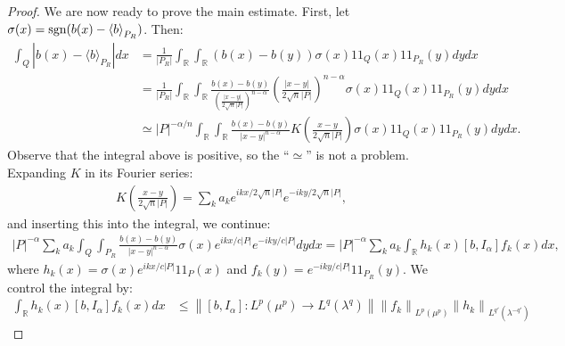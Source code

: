 \documentclass[12pt]{amsart}
\begin{document}
\begin{proof}
We are now ready to prove the main estimate. First, let
$\sigma(x)=\textnormal{sgn}(b(x)-{\langle {b} \rangle}_{P_R})$. Then:
\begin{align*}
\int_{Q}{\ensuremath{\left\vert{b(x)-{\langle {b} \rangle}_{P_R}}\right\vert}}dx
&=\frac{1}{{\ensuremath{\left\vert{P_R}\right\vert}}}\int_{\mathbb{R}}\int_{\mathbb{R}}
  (b(x)-b(y))\sigma(x){1\!\!1}_{Q}(x){1\!\!1}_{P_R}(y)dydx
\\&=\frac{1}{{\ensuremath{\left\vert{P_R}\right\vert}}}\int_{\mathbb{R}}\int_{\mathbb{R}}
  \frac{b(x)-b(y)}{\left(\frac{{\ensuremath{\left\vert{x-y}\right\vert}}}{2\sqrt{n}{\ensuremath{\left\vert{P}\right\vert}}}\right)^{n-\alpha}}
  \left(\frac{{\ensuremath{\left\vert{x-y}\right\vert}}}{2\sqrt{n}{\ensuremath{\left\vert{P}\right\vert}}}\right)^{n-\alpha}
  \sigma(x){1\!\!1}_{Q}(x){1\!\!1}_{P_R}(y)dydx
\\&\simeq {\ensuremath{\left\vert{P}\right\vert}}^{-\alpha/n}\int_{\mathbb{R}}\int_{\mathbb{R}}
  \frac{b(x)-b(y)}{{\ensuremath{\left\vert{x-y}\right\vert}}^{n-\alpha}}
  K\left(\frac{x-y}{2\sqrt{n}{\ensuremath{\left\vert{P}\right\vert}}}\right)
  \sigma(x){1\!\!1}_{Q}(x){1\!\!1}_{P_R}(y)dydx.
\end{align*}
Observe that the integral above is positive, so the ``$\simeq$''
is not a problem. Expanding $K$ in its Fourier series:
\begin{align*}
K\left(\frac{x-y}{2\sqrt{n}{\ensuremath{\left\vert{P}\right\vert}}}\right)
=\sum_{k}a_ke^{ikx/2\sqrt{n}{\ensuremath{\left\vert{P}\right\vert}}}e^{-iky/2\sqrt{n}{\ensuremath{\left\vert{P}\right\vert}}},
\end{align*}
and inserting this into the integral, we continue:
\begin{align*}
{\ensuremath{\left\vert{P}\right\vert}}^{-\alpha}\sum_{k}a_k\int_{Q}\int_{P_R}
  \frac{b(x)-b(y)}{{\ensuremath{\left\vert{x-y}\right\vert}}^{n-\alpha}}
  \sigma(x)e^{ikx/c{\ensuremath{\left\vert{P}\right\vert}}}e^{-iky/c{\ensuremath{\left\vert{P}\right\vert}}}dydx
={\ensuremath{\left\vert{P}\right\vert}}^{-\alpha}\sum_{k}a_k\int_{\mathbb{R}}
  h_k(x)[b,I_\alpha]f_k(x)dx,
\end{align*}
where $h_k(x)=\sigma(x)e^{ikx/c{\ensuremath{\left\vert{P}\right\vert}}}{1\!\!1}_{P}(x)$ and
$f_k(y)=e^{-iky/c{\ensuremath{\left\vert{P}\right\vert}}}{1\!\!1}_{P_R}(y)$. We control the integral
by:
\begin{align*}
\int_{\mathbb{R}}h_k(x)[b,I_\alpha]f_k(x)dx
&\leq {\ensuremath{\left\|{[b,I_\alpha]:L^p(\mu^p)\to L^q(\lambda^q)}\right\|}}
  {\ensuremath{\left\|{f_k}\right\|}}_{L^p(\mu^p)}{\ensuremath{\left\|{h_k}\right\|}}_{L^{q'}(\lambda^{-q'})}

\end{align*}
\end{proof}
\end{document}
